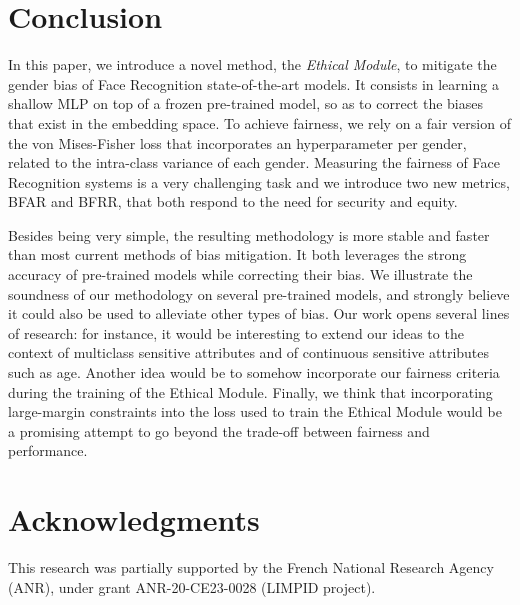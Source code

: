 \documentclass[nohyperref]{article}
\theoremstyle{plain}
\theoremstyle{definition}
\theoremstyle{remark}
\begin{document}
\section{Conclusion}

In this paper, we introduce a novel method, the {\it Ethical Module}, to mitigate the gender bias of Face Recognition state-of-the-art models. It consists in learning a shallow MLP on top of a frozen pre-trained model, so as to correct the biases that exist in the embedding space. To achieve fairness, we rely on a fair version of the von Mises-Fisher loss that incorporates an hyperparameter per gender, related to the intra-class variance of each gender. Measuring the fairness of Face Recognition systems is a very challenging task and we introduce two new metrics, BFAR and BFRR, that both respond to the need for security and equity. 

Besides being very simple, the resulting methodology is more stable and faster than most current methods of bias mitigation. It both leverages the strong accuracy of pre-trained models while correcting their bias. We illustrate the soundness of our methodology on several pre-trained models, and strongly believe it could also be used to alleviate other types of bias. Our work opens several lines of research: for instance, it would be interesting to extend our ideas to the context of multiclass sensitive attributes and of continuous sensitive attributes such as age. Another idea would be to somehow incorporate our fairness criteria during the training of the Ethical Module. Finally, we think that incorporating large-margin constraints into the loss used to train the Ethical Module would be a promising attempt to go beyond the trade-off between fairness and performance.


















 
\section*{Acknowledgments}
This research was partially supported by the French National Research Agency (ANR), under grant ANR-20-CE23-0028 (LIMPID project).
\end{document}

